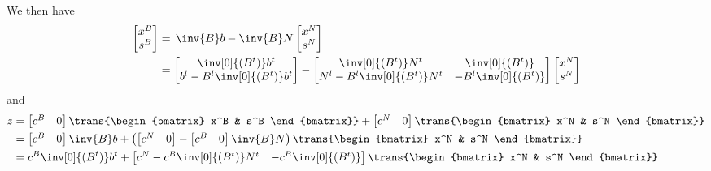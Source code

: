 We then have
\begin{equation}
\begin{split}
\begin{bmatrix} x^B \\ s^B \end{bmatrix} & = \,
\inv{B}b - \inv{B} N \begin{bmatrix} x^N \\ s^N \end{bmatrix} \\
%
& = \begin{bmatrix}
      \inv[0]{(B^t)} b^t \\ b^l - B^l\inv[0]{(B^t)} b^t
    \end{bmatrix} -
    \begin{bmatrix}
      \inv[0]{(B^t)} N^t & \inv[0]{(B^t)} \\
      N^l - B^l\inv[0]{(B^t)}N^t & -B^l\inv[0]{(B^t)}
    \end{bmatrix}
    \begin{bmatrix} x^N \\ s^N \end{bmatrix}
\end{split} \label{Eqn:PrimalBasicVars}
\end{equation}
and
\begin{equation}
\begin{split}
z & = \begin{bmatrix} c^B & 0 \end{bmatrix}
      \trans{\begin{bmatrix} x^B & s^B \end{bmatrix}} +
      \begin{bmatrix} c^N & 0 \end{bmatrix}
      \trans{\begin{bmatrix} x^N & s^N \end{bmatrix}} \\
  & = \begin{bmatrix} c^B & 0 \end{bmatrix}\inv{B}b +
      \left(
        \begin{bmatrix} c^N & 0 \end{bmatrix} -
        \begin{bmatrix} c^B & 0 \end{bmatrix} \inv{B} N
      \right)
      \trans{\begin{bmatrix} x^N & s^N \end{bmatrix}} \\
  & = c^B \inv[0]{(B^t)} b^t +
      \begin{bmatrix}
	c^N - c^B \inv[0]{(B^t)} N^t & -c^B\inv[0]{(B^t)} \end{bmatrix}
      \trans{\begin{bmatrix} x^N & s^N \end{bmatrix}}
\end{split} \label{Eqn:PrimalObj}
\end{equation}
